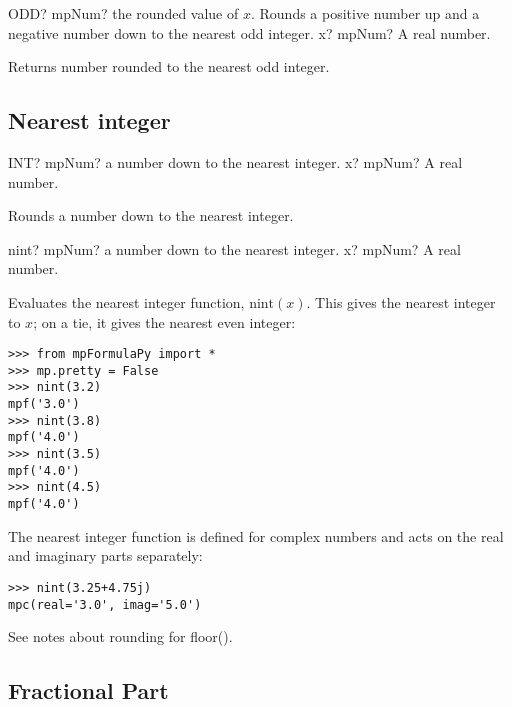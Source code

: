 \begin{mpFunctionsExtract}
	\mpWorksheetFunctionOneNotImplemented
	{ODD? mpNum? the rounded value of $x$. Rounds a positive number up and a negative number down to the nearest odd integer.}
	{x? mpNum? A real number.}
\end{mpFunctionsExtract}

\vspace{0.3cm}
Returns number rounded to the nearest odd integer.




\subsection{Nearest integer}

\begin{mpFunctionsExtract}
	\mpWorksheetFunctionOneNotImplemented
	{INT? mpNum?  a number down to the nearest integer.}
	{x? mpNum? A real number.}
\end{mpFunctionsExtract}

\vspace{0.3cm}
Rounds a number down to the nearest integer.



\begin{mpFunctionsExtract}
	\mpFunctionOne
	{nint? mpNum?  a number down to the nearest integer.}
	{x? mpNum? A real number.}
\end{mpFunctionsExtract}


\vpara
Evaluates the nearest integer function, $\text{nint}(x)$. This gives the nearest integer to $x$; on a tie, it gives the nearest even integer:

\begin{lstlisting}
>>> from mpFormulaPy import *
>>> mp.pretty = False
>>> nint(3.2)
mpf('3.0')
>>> nint(3.8)
mpf('4.0')
>>> nint(3.5)
mpf('4.0')
>>> nint(4.5)
mpf('4.0')
\end{lstlisting}


The nearest integer function is defined for complex numbers and acts on the real and imaginary parts separately:

\begin{lstlisting}
>>> nint(3.25+4.75j)
mpc(real='3.0', imag='5.0')
\end{lstlisting}


See notes about rounding for floor().



\subsection{Fractional Part}

